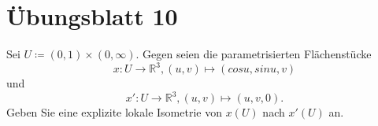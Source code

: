 %
\section{Übungsblatt 10}
\begin{assignment}
 Sei $ U \coloneqq (0,1) \times (0, \infty) $. Gegen seien die parametrisierten Flächenstücke
 \begin{equation*}
    x : U \to \mathbb{R}^3, (u,v) \mapsto (cosu, sinu, v)
  \end{equation*} 
  und 
  \begin{equation*}
    x' : U \to \mathbb{R}^3, (u,v) \mapsto (u,v,0).
  \end{equation*}
  Geben Sie eine explizite lokale Isometrie von $ x(U) $ nach $ x'(U) $ an.
\end{assignment}
